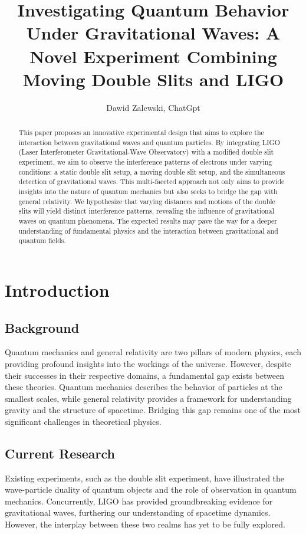 \documentclass{article}
\title{Investigating Quantum Behavior Under Gravitational Waves: A Novel Experiment Combining Moving Double Slits and LIGO
}
\author{Dawid Zalewski, ChatGpt}
\begin{document}
\maketitle

\begin{abstract}
This paper proposes an innovative experimental design that aims to explore the interaction between gravitational waves and quantum particles. By integrating LIGO (Laser Interferometer Gravitational-Wave Observatory) with a modified double slit experiment, we aim to observe the interference patterns of electrons under varying conditions: a static double slit setup, a moving double slit setup, and the simultaneous detection of gravitational waves. This multi-faceted approach not only aims to provide insights into the nature of quantum mechanics but also seeks to bridge the gap with general relativity. We hypothesize that varying distances and motions of the double slits will yield distinct interference patterns, revealing the influence of gravitational waves on quantum phenomena. The expected results may pave the way for a deeper understanding of fundamental physics and the interaction between gravitational and quantum fields.
\end{abstract}

\section{Introduction}

\subsection{Background}
Quantum mechanics and general relativity are two pillars of modern physics, each providing profound insights into the workings of the universe. However, despite their successes in their respective domains, a fundamental gap exists between these theories. Quantum mechanics describes the behavior of particles at the smallest scales, while general relativity provides a framework for understanding gravity and the structure of spacetime. Bridging this gap remains one of the most significant challenges in theoretical physics.

\subsection{Current Research}
Existing experiments, such as the double slit experiment, have illustrated the wave-particle duality of quantum objects and the role of observation in quantum mechanics. Concurrently, LIGO has provided groundbreaking evidence for gravitational waves, furthering our understanding of spacetime dynamics. However, the interplay between these two realms has yet to be fully explored.
\end{document}
